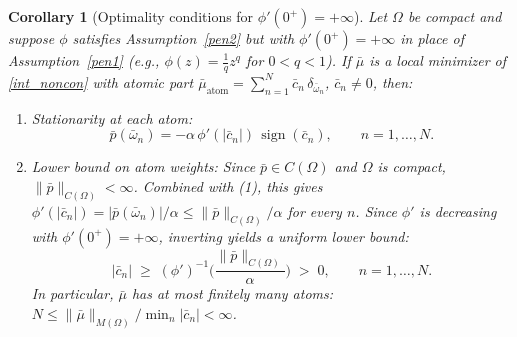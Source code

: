 \documentclass[12pt,fleqn]{amsart}
\newtheorem{corollary}{Corollary}[theorem]
\theoremstyle{definition}
\DeclareMathOperator*{\atom}{atom}
\DeclareMathOperator*{\sign}{sign}
\begin{document}
\begin{corollary}[Optimality conditions for $\phi'(0^+) = +\infty$]                     
\label{cor:singular_penalty}                                                                                                                                                                                                                
Let $\Omega$ be compact and suppose $\phi$ satisfies Assumption~\ref{pen2} but with $\phi'(0^+) = +\infty$ in place of Assumption~\ref{pen1}                                                                                                
(e.g., $\phi(z) = \frac{1}{q}z^q$ for $0 < q < 1$).                                                                                                                                                                                         
If $\bar{\mu}$ is a local minimizer of \eqref{int_noncon} with atomic part                                                                                                                                                                  
$\bar{\mu}_{\atom} = \sum_{n=1}^N \bar{c}_n\,\delta_{\bar{\omega}_n}$, $\bar{c}_n \neq 0$, then:
\begin{enumerate}
	\item Stationarity at each atom:
	\[
		\bar{p}(\bar{\omega}_n) = -\alpha\,\phi'(|\bar{c}_n|)\,\sign(\bar{c}_n),
		\qquad n = 1, \dots, N.
	\]

	\item Lower bound on atom weights:
	Since $\bar{p} \in C(\Omega)$ and $\Omega$ is compact,
	$\|\bar{p}\|_{C(\Omega)} < \infty$.
	Combined with (1), this gives
	$\phi'(|\bar{c}_n|) = |\bar{p}(\bar{\omega}_n)|/\alpha \le \|\bar{p}\|_{C(\Omega)}/\alpha$
	for every $n$. Since $\phi'$ is decreasing with $\phi'(0^+) = +\infty$,
	inverting yields a uniform lower bound:
	\[
		|\bar{c}_n| \;\ge\; (\phi')^{-1}\!\Big(\frac{\|\bar{p}\|_{C(\Omega)}}{\alpha}\Big)
		\;>\; 0,
		\qquad n = 1, \dots, N.
	\]
	In particular, $\bar{\mu}$ has at most finitely many atoms:
	$N \le \|\bar{\mu}\|_{M(\Omega)} \big/ \min_n |\bar{c}_n| < \infty$.
\end{enumerate}
\end{corollary}
\end{document}
